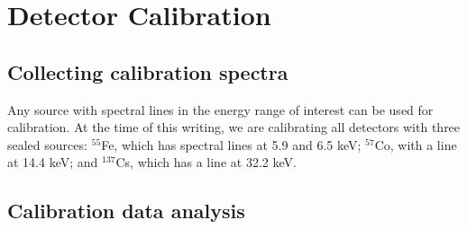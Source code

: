\chapter{Detector Calibration\label{chap:calib}}

\section{Collecting calibration spectra}

Any source with spectral lines in the energy range of interest can be
used for calibration. At the time of this writing, we are calibrating
all detectors with three sealed sources: $^{55}$Fe, which has spectral
lines at 5.9 and 6.5 keV; $^{57}$Co, with a line at 14.4 keV; and
$^{137}$Cs, which has a line at 32.2 keV.


\section{Calibration data analysis}

